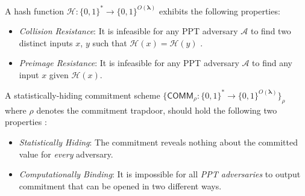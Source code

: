 \begin{definition}
	\label{def:Collision-resistance hash function}
	A hash function $\mathcal{H}: \{0, 1\}^\ast \rightarrow \{0,1\}^{O(\boldsymbol{\lambda})}$ exhibits the following properties:
	\begin{itemize}
		\item \textit{Collision Resistance}: It is infeasible for any PPT adversary $\mathcal{A}$ to find two distinct inputs $x$, $y$ such that $\mathcal{H}(x) = \mathcal{H}(y)$  \cite{katz2020introduction}.
		\item \textit{Preimage Resistance}: It is infeasible for any PPT adversary $\mathcal{A}$ to find any input $x$ given $\mathcal{H}(x)$.
	\end{itemize} 
\end{definition}

\begin{definition}
	\label{def:Statistically-hiding commitment}
	A statistically-hiding commitment scheme  $\{\mathsf{COMM}_\rho:\{0,1\}^* \rightarrow \{0, 1\}^{O(\boldsymbol{\lambda})} \}_\rho$ \cite{zcash2014} where $\rho$ denotes the commitment trapdoor, should hold the following two properties \cite{katz2020introduction, zcash2014}:
	\begin{itemize}
		\item \textit{Statistically Hiding}: The commitment reveals nothing about the committed value for \textit{every} adversary. 
		\item \textit{Computationally Binding}: It is impossible for all \textit{PPT adversaries} to output commitment that can be opened in two different ways.
	\end{itemize}
\end{definition}

